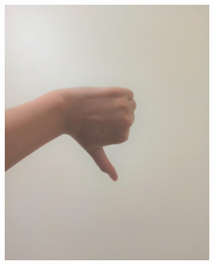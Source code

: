 \documentclass[conference]{IEEEtran}
\begin{document}
\begin{figure} [h]
\begin{center}
\begin{subfigure}[t]{0.11\textwidth}
				\includegraphics[width=\textwidth]{img/pola8a.jpg}
				\caption{\label{fig:gs8a}}
			\end{subfigure}
			\hspace{0.1em}
			\begin{subfigure}[t]{0.11\textwidth}
				\centering

\end{subfigure}
\end{center}
\end{figure}
\end{document}
